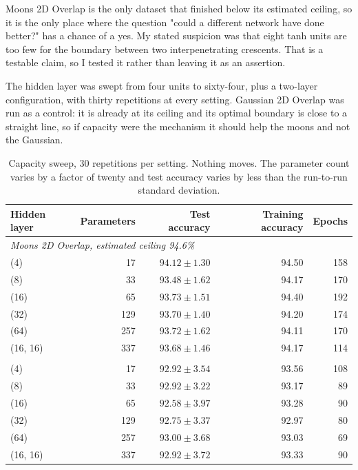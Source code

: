 \documentclass[11pt]{article}
\begin{document}
Moons 2D Overlap is the only dataset that finished below its estimated ceiling,
so it is the only place where the question "could a different network have done
better?" has a chance of a yes. My stated suspicion was that eight tanh units
are too few for the boundary between two interpenetrating crescents. That is a
testable claim, so I tested it rather than leaving it as an assertion.

The hidden layer was swept from four units to sixty-four, plus a two-layer
configuration, with thirty repetitions at every setting. Gaussian 2D Overlap was
run as a control: it is already at its ceiling and its optimal boundary is close
to a straight line, so if capacity were the mechanism it should help the moons
and not the Gaussian.

\begin{table}[H]
\centering
\small
\begin{tabular}{lrrrr}
\toprule
Hidden layer & Parameters & Test accuracy & Training accuracy & Epochs \\
\midrule
\multicolumn{5}{l}{\emph{Moons 2D Overlap, estimated ceiling 94.6\%}} \\
(4)      &  17 & $94.12 \pm 1.30$ & 94.50 & 158 \\
(8)      &  33 & $93.48 \pm 1.62$ & 94.17 & 170 \\
(16)     &  65 & $93.73 \pm 1.51$ & 94.40 & 192 \\
(32)     & 129 & $93.70 \pm 1.40$ & 94.20 & 174 \\
(64)     & 257 & $93.72 \pm 1.62$ & 94.11 & 170 \\
(16, 16) & 337 & $93.68 \pm 1.46$ & 94.17 & 114 \\
\addlinespace
\multicolumn{5}{l}{\emph{Gaussian 2D Overlap, estimated ceiling 92.5\%}} \\
(4)      &  17 & $92.92 \pm 3.54$ & 93.56 & 108 \\
(8)      &  33 & $92.92 \pm 3.22$ & 93.17 &  89 \\
(16)     &  65 & $92.58 \pm 3.97$ & 93.28 &  90 \\
(32)     & 129 & $92.75 \pm 3.37$ & 92.97 &  80 \\
(64)     & 257 & $93.00 \pm 3.68$ & 93.03 &  69 \\
(16, 16) & 337 & $92.92 \pm 3.72$ & 93.33 &  90 \\
\bottomrule
\end{tabular}
\caption{Capacity sweep, 30 repetitions per setting. Nothing moves. The
parameter count varies by a factor of twenty and test accuracy varies by less
than the run-to-run standard deviation.}
\label{tab:capacity}
\end{table}
\end{document}
